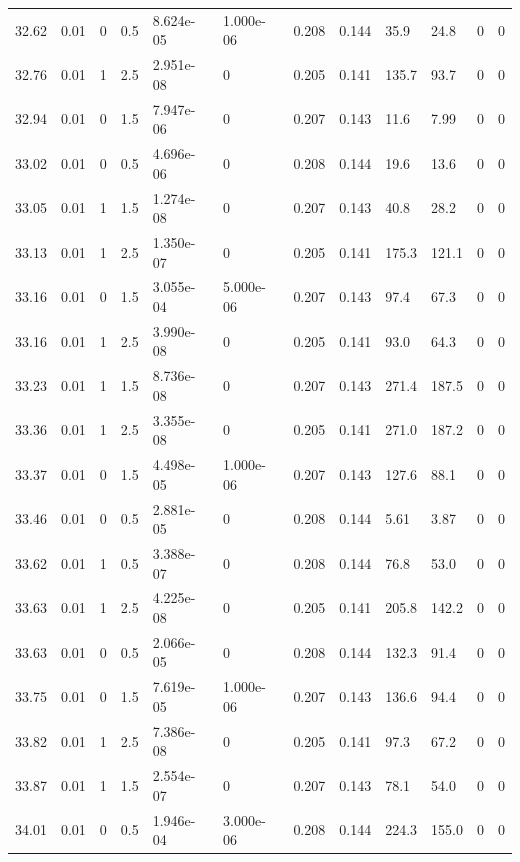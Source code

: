 \documentclass[preview]{standalone}
\begin{document}
{{{{{{{{{{\begin{tabular}{L{1.2cm}C{1.2cm} C{0.3cm}C{0.5cm} C{1.4cm}C{1.4cm} C{1.4cm}C{1.4cm} C{1.6cm}C{1.6cm} C{1.6cm}C{1.6cm}}
  32.62  &  0.01  & 0     & 0.5 &  8.624e-05  & 1.000e-06  &  0.208&   0.144& 35.9 & 24.8   &  0 & 0  \\ 
  32.76  &  0.01  & 1     & 2.5 &  2.951e-08  & 0  &  0.205&   0.141& 135.7 & 93.7   &  0 & 0  \\ 
  32.94  &  0.01  & 0     & 1.5 &  7.947e-06  & 0  &  0.207&   0.143& 11.6 & 7.99   &  0 & 0  \\ 
  33.02  &  0.01  & 0     & 0.5 &  4.696e-06  & 0  &  0.208&   0.144& 19.6 & 13.6   &  0 & 0  \\ 
  33.05  &  0.01  & 1     & 1.5 &  1.274e-08  & 0  &  0.207&   0.143& 40.8 & 28.2   &  0 & 0  \\ 
  33.13  &  0.01  & 1     & 2.5 &  1.350e-07  & 0  &  0.205&   0.141& 175.3 & 121.1   &  0 & 0  \\ 
  33.16  &  0.01  & 0     & 1.5 &  3.055e-04  & 5.000e-06  &  0.207&   0.143& 97.4 & 67.3   &  0 & 0  \\ 
  33.16  &  0.01  & 1     & 2.5 &  3.990e-08  & 0  &  0.205&   0.141& 93.0 & 64.3   &  0 & 0  \\ 
  33.23  &  0.01  & 1     & 1.5 &  8.736e-08  & 0  &  0.207&   0.143& 271.4 & 187.5   &  0 & 0  \\ 
  33.36  &  0.01  & 1     & 2.5 &  3.355e-08  & 0  &  0.205&   0.141& 271.0 & 187.2   &  0 & 0  \\ 
  33.37  &  0.01  & 0     & 1.5 &  4.498e-05  & 1.000e-06  &  0.207&   0.143& 127.6 & 88.1   &  0 & 0  \\ 
  33.46  &  0.01  & 0     & 0.5 &  2.881e-05  & 0  &  0.208&   0.144& 5.61 & 3.87   &  0 & 0  \\ 
  33.62  &  0.01  & 1     & 0.5 &  3.388e-07  & 0  &  0.208&   0.144& 76.8 & 53.0   &  0 & 0  \\ 
  33.63  &  0.01  & 1     & 2.5 &  4.225e-08  & 0  &  0.205&   0.141& 205.8 & 142.2   &  0 & 0  \\ 
  33.63  &  0.01  & 0     & 0.5 &  2.066e-05  & 0  &  0.208&   0.144& 132.3 & 91.4   &  0 & 0  \\ 
  33.75  &  0.01  & 0     & 1.5 &  7.619e-05  & 1.000e-06  &  0.207&   0.143& 136.6 & 94.4   &  0 & 0  \\ 
  33.82  &  0.01  & 1     & 2.5 &  7.386e-08  & 0  &  0.205&   0.141& 97.3 & 67.2   &  0 & 0  \\ 
  33.87  &  0.01  & 1     & 1.5 &  2.554e-07  & 0  &  0.207&   0.143& 78.1 & 54.0   &  0 & 0  \\ 
  34.01  &  0.01  & 0     & 0.5 &  1.946e-04  & 3.000e-06  &  0.208&   0.144& 224.3 & 155.0   &  0 & 0  \\ 

\end{tabular}}}}}}}}}}}
\end{document}
